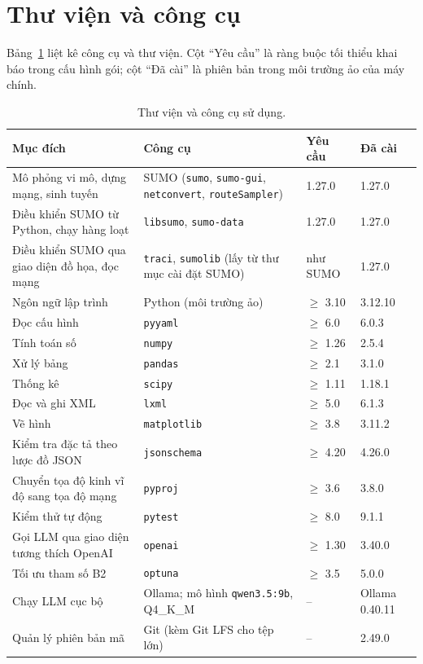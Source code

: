 \documentclass[../main.tex]{subfiles}
\begin{document}
\section{Thư viện và công cụ}
\label{section:tools}

Bảng~\ref{table:4.3} liệt kê công cụ và thư viện. Cột ``Yêu cầu'' là ràng buộc tối thiểu khai báo trong cấu hình gói; cột ``Đã cài'' là phiên bản trong môi trường ảo của máy chính.

\begin{table}[!htbp]
\centering
\small
\caption{Thư viện và công cụ sử dụng.} \label{table:4.3}
\begin{tabular}{|>{\raggedright\arraybackslash}p{4.6cm}|>{\raggedright\arraybackslash}p{4.4cm}|p{2.0cm}|p{2.0cm}|}
\hline
\textbf{Mục đích} & \textbf{Công cụ} & \textbf{Yêu cầu} & \textbf{Đã cài} \\ \hline
Mô phỏng vi mô, dựng mạng, sinh tuyến & SUMO (\texttt{sumo}, \texttt{sumo-gui}, \texttt{netconvert}, \texttt{routeSampler})~\cite{lopez2018sumo} & 1.27.0 & 1.27.0 \\ \hline
Điều khiển SUMO từ Python, chạy hàng loạt & \texttt{libsumo}, \texttt{sumo-data} & 1.27.0 & 1.27.0 \\ \hline
Điều khiển SUMO qua giao diện đồ họa, đọc mạng & \texttt{traci}, \texttt{sumolib} (lấy từ thư mục cài đặt SUMO) & như SUMO & 1.27.0 \\ \hline
Ngôn ngữ lập trình & Python (môi trường ảo) & $\geq$ 3.10 & 3.12.10 \\ \hline
Đọc cấu hình & \texttt{pyyaml} & $\geq$ 6.0 & 6.0.3 \\ \hline
Tính toán số & \texttt{numpy} & $\geq$ 1.26 & 2.5.4 \\ \hline
Xử lý bảng & \texttt{pandas} & $\geq$ 2.1 & 3.1.0 \\ \hline
Thống kê & \texttt{scipy} & $\geq$ 1.11 & 1.18.1 \\ \hline
Đọc và ghi XML & \texttt{lxml} & $\geq$ 5.0 & 6.1.3 \\ \hline
Vẽ hình & \texttt{matplotlib} & $\geq$ 3.8 & 3.11.2 \\ \hline
Kiểm tra đặc tả theo lược đồ JSON & \texttt{jsonschema} & $\geq$ 4.20 & 4.26.0 \\ \hline
Chuyển tọa độ kinh vĩ độ sang tọa độ mạng & \texttt{pyproj} & $\geq$ 3.6 & 3.8.0 \\ \hline
Kiểm thử tự động & \texttt{pytest} & $\geq$ 8.0 & 9.1.1 \\ \hline
Gọi LLM qua giao diện tương thích OpenAI & \texttt{openai} & $\geq$ 1.30 & 3.40.0 \\ \hline
Tối ưu tham số B2~\cite{akiba2019optuna} & \texttt{optuna} & $\geq$ 3.5 & 5.0.0 \\ \hline
Chạy LLM cục bộ & Ollama; mô hình \texttt{qwen3.5:9b}, Q4\_K\_M & -- & Ollama 0.40.11 \\ \hline
Quản lý phiên bản mã & Git (kèm Git LFS cho tệp lớn) & -- & 2.49.0 \\ \hline
\end{tabular}
\end{table}
\end{document}
